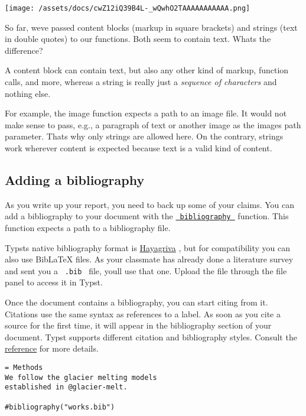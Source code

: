 \texttt{[image: /assets/docs/cwZ12iQ39B4L-\_wQwhO2TAAAAAAAAAAA.png]}

So far, we\textquotesingle ve passed content blocks (markup in square
brackets) and strings (text in double quotes) to our functions. Both
seem to contain text. What\textquotesingle s the difference?

A content block can contain text, but also any other kind of markup,
function calls, and more, whereas a string is really just a
\emph{sequence of characters} and nothing else.

For example, the image function expects a path to an image file. It
would not make sense to pass, e.g., a paragraph of text or another image
as the image\textquotesingle s path parameter. That\textquotesingle s
why only strings are allowed here. On the contrary, strings work
wherever content is expected because text is a valid kind of content.

\subsection{Adding a bibliography}\label{bibliography}

As you write up your report, you need to back up some of your claims.
You can add a bibliography to your document with the
\href{/docs/reference/model/bibliography/}{\texttt{\ bibliography\ }}
function. This function expects a path to a bibliography file.

Typst\textquotesingle s native bibliography format is
\href{https://github.com/typst/hayagriva/blob/main/docs/file-format.md}{Hayagriva}
, but for compatibility you can also use BibLaTeX files. As your
classmate has already done a literature survey and sent you a
\texttt{\ .bib\ } file, you\textquotesingle ll use that one. Upload the
file through the file panel to access it in Typst.

Once the document contains a bibliography, you can start citing from it.
Citations use the same syntax as references to a label. As soon as you
cite a source for the first time, it will appear in the bibliography
section of your document. Typst supports different citation and
bibliography styles. Consult the
\href{/docs/reference/model/bibliography/\#parameters-style}{reference}
for more details.

\begin{verbatim}
= Methods
We follow the glacier melting models
established in @glacier-melt.

#bibliography("works.bib")
\end{verbatim}

